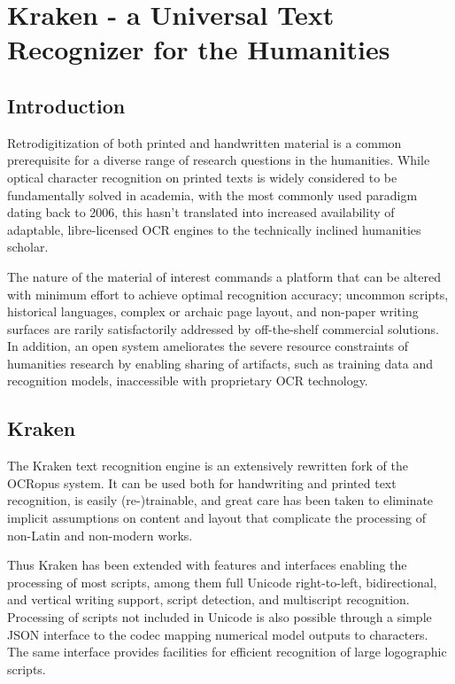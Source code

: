 
\chapter{Kraken - a Universal Text Recognizer for the Humanities}
\section{Introduction}

Retrodigitization of both printed and handwritten material is a common
prerequisite for a diverse range of research questions in the humanities. While
optical character recognition on printed texts is widely considered to be
fundamentally solved in academia, with the most commonly used paradigm
\cite{graves2006connectionist} dating back to 2006, this hasn't translated into
increased availability of adaptable, libre-licensed OCR engines to the
technically inclined humanities scholar. 

The nature of the material of interest commands a platform that can be altered
with minimum effort to achieve optimal recognition accuracy; uncommon scripts,
historical languages, complex or archaic page layout, and non-paper writing
surfaces are rarily satisfactorily addressed by off-the-shelf commercial
solutions. In addition, an open system ameliorates the severe resource
constraints of humanities research by enabling sharing of artifacts, such as
training data and recognition models, inaccessible with proprietary OCR
technology.

\section{Kraken}

The Kraken text recognition engine is an extensively rewritten fork of the
OCRopus system. It can be used both for handwriting and printed text
recognition, is easily (re-)trainable, and great care has been taken to
eliminate implicit assumptions on content and layout that complicate the
processing of non-Latin and non-modern works.

Thus Kraken has been extended with features and interfaces enabling the
processing of most scripts, among them full Unicode right-to-left,
bidirectional, and vertical writing support, script detection, and multiscript
recognition. Processing of scripts not included in Unicode is also possible
through a simple JSON interface to the codec mapping numerical model outputs to
characters. The same interface provides facilities for efficient recognition of
large logographic scripts.

